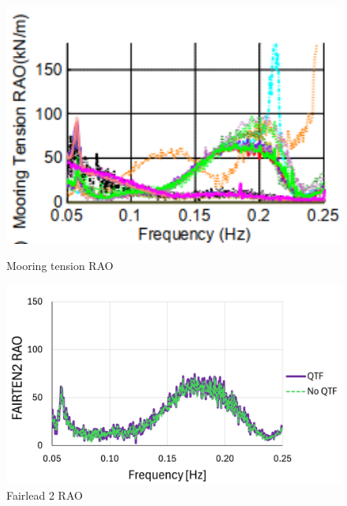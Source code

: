 \documentclass[a4paper, 11pt]{article}
\begin{document}
\begin{figure}[H]
    \begin{minipage}{0.48\textwidth}
        \centering
        \includegraphics[width=1\textwidth]{2.6_ten.png}
        \caption{\small Mooring tension RAO \cite{Robertson2014}}
        \label{fig:2.6_fairten2}
    \end{minipage}
    \hfill
    \begin{minipage}{0.5\textwidth}
        \centering
        \vspace{0.4cm}
        \includegraphics[width=1\textwidth]{2.6_ten_mine.png}
        \caption{\small Fairlead 2 RAO}
        \label{fig:2.6_fairten2_mine}
    \end{minipage}
\end{figure}
\end{document}
